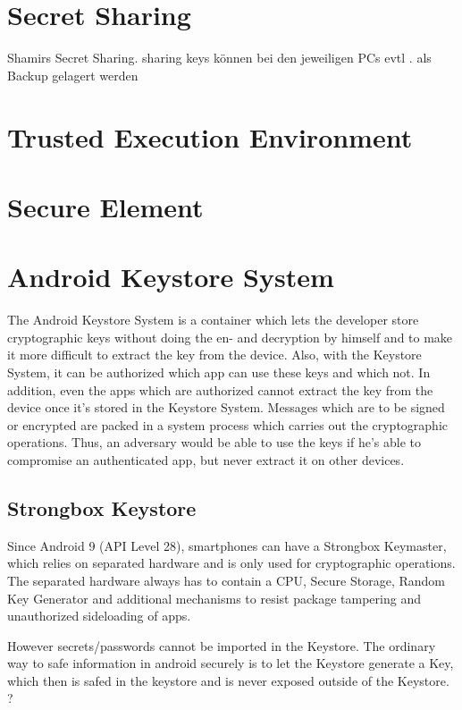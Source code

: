 \documentclass[12pt,oneside,a4paper,parskip]{scrbook}
\begin{document}
\section{Secret Sharing}

Shamirs Secret Sharing. sharing keys können bei den jeweiligen PCs evtl . als Backup gelagert werden

\section{Trusted Execution Environment}

\section{Secure Element}

\section{Android Keystore System}

The Android Keystore System is a container which lets the developer store cryptographic keys without doing the en- and decryption by himself and to make it more difficult to extract the key from the device. Also, with the Keystore System, it can be authorized which app can use these keys and which not. In addition, even the apps which are authorized cannot extract the key from the device once it's stored in the Keystore System. Messages which are to be signed or encrypted are packed in a system process which carries out the cryptographic operations. Thus, an adversary would be able to use the keys if he's able to compromise an authenticated app, but never extract it on other devices.

\subsection{Strongbox Keystore}

Since Android 9 (API Level 28), smartphones can have a Strongbox Keymaster, which relies on separated hardware and is only used for cryptographic operations.
The separated hardware always has to contain a CPU, Secure Storage, Random Key Generator and additional mechanisms to resist package tampering and unauthorized sideloading of apps.

However secrets/passwords cannot be imported in the Keystore. The ordinary way to safe information in android securely is to let the Keystore generate a Key, which then 
is safed in the keystore and is never exposed outside of the Keystore. ? 
\end{document}
